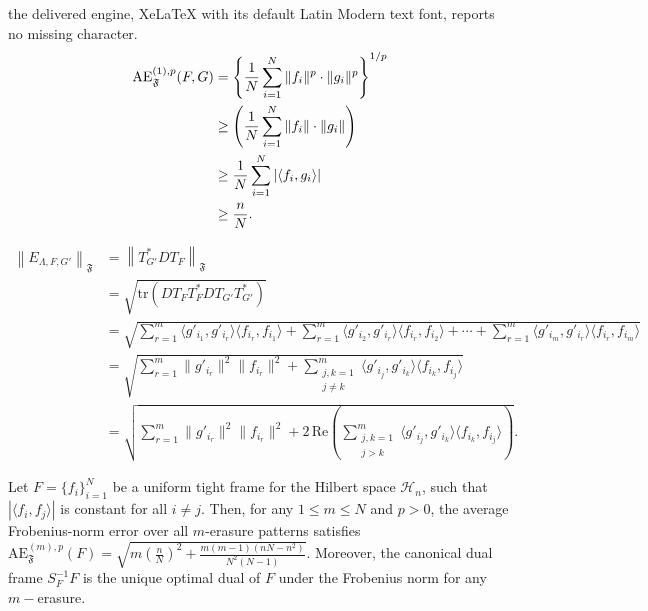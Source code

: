 \documentclass[10pt,a4paper]{amsart}
\begin{document}
the delivered engine, XeLaTeX with its default Latin Modern text font, reports no missing character.
\begin{align}\label{eqn4.6}
\mathrm{AE}_{\mathfrak{F}}^{(1),p}(F, G)
&= \left\{ \frac{1}{N} \sum_{i=1}^N \|f_i\|^p \cdot \|g_i\|^p \right\}^{1/p} \notag \\
&\geq \left( \frac{1}{N} \sum_{i=1}^N \|f_i\| \cdot \|g_i\| \right) \notag \\
&\geq \frac{1}{N} \sum_{i=1}^N \left| \langle f_i, g_i \rangle \right| \notag \\
&\geq \frac{n}{N}.
\end{align}

\begin{align} \label{eqn4point8}
\left\|E_{\Lambda, F, G'}\right\|_{\mathfrak{F}} 
&= \left\|T_{G'}^* D T_F\right\|_{\mathfrak{F}} \nonumber \\
&= \sqrt{\mathrm{tr}\left(D T_F T_F^* D T_{G'} T_{G'}^*\right)} \nonumber \\
&= \sqrt{ \sum_{r=1}^m \langle g'_{i_1}, g'_{i_r} \rangle \langle f_{i_r}, f_{i_1} \rangle 
      + \sum_{r=1}^m \langle g'_{i_2}, g'_{i_r} \rangle \langle f_{i_r}, f_{i_2} \rangle 
      + \cdots 
      + \sum_{r=1}^m \langle g'_{i_m}, g'_{i_r} \rangle \langle f_{i_r}, f_{i_m} \rangle } \nonumber \\
&= \sqrt{ \sum_{r=1}^m \|g'_{i_r}\|^2 \|f_{i_r}\|^2 
      + \sum_{\substack{j,k=1 \\ j \neq k}}^m \langle g'_{i_j}, g'_{i_k} \rangle \langle f_{i_k}, f_{i_j} \rangle } \nonumber \\
&= \sqrt{ \sum_{r=1}^m \|g'_{i_r}\|^2 \|f_{i_r}\|^2 
      + 2\, \mathrm{Re} \left( \sum_{\substack{j,k=1 \\ j > k}}^m \langle g'_{i_j}, g'_{i_k} \rangle \langle f_{i_k}, f_{i_j} \rangle \right) }.
\end{align}

     \begin{thm}\label{thm3point4}
Let \( F = \{f_i\}_{i=1}^N \) be a uniform tight frame for the Hilbert space \( \mathcal{H}_n \), such that \( |\langle f_i, f_j \rangle| \) is constant for all \( i \neq j \). Then, for any \( 1 \leq m \leq N \) and \( p > 0 \), the average Frobenius-norm error over all \( m \)-erasure patterns satisfies $\mathrm{AE}_{\mathfrak{F}}^{(m),p}(F) = \sqrt{m\left(\frac{n}{N}\right)^2 + \frac{m(m-1)(nN - n^2)}{N^2(N-1)}}. $
Moreover, the canonical dual frame \( S_F^{-1} F \) is the unique optimal dual of \( F \) under the Frobenius norm for any \( m-\)erasure. 
\end{thm}
\end{document}
